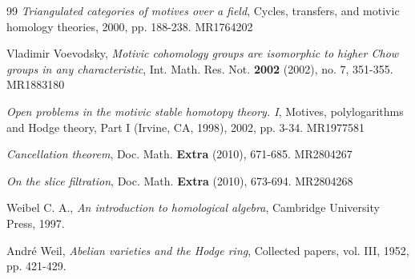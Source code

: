 \documentclass[10pt]{amsart}
\theoremstyle{definition}
\theoremstyle{remark}
\theoremstyle{definition}
\begin{document}
\begin{thebibliography}{99}
 \textit{Triangulated categories of motives over a field}, Cycles, transfers, and motivic homology theories, 2000, pp. 188-238. MR1764202

 Vladimir Voevodsky, \textit{Motivic cohomology groups are isomorphic to higher Chow groups in any characteristic}, Int. Math. Res. Not. \textbf{2002} (2002), no. 7, 351-355. MR1883180

 \textit{Open problems in the motivic stable homotopy theory. I}, Motives, polylogarithms and Hodge theory, Part I (Irvine, CA, 1998), 2002, pp. 3-34. MR1977581

 \textit{Cancellation theorem}, Doc. Math. \textbf{Extra} (2010), 671-685. MR2804267

 \textit{On the slice filtration}, Doc. Math. \textbf{Extra} (2010), 673-694. MR2804268

   Weibel C. A., \textit{An introduction to homological algebra}, Cambridge University Press, 1997.

 Andr\'e Weil, \textit{Abelian varieties and the Hodge ring}, Collected papers, vol. III, 1952, pp. 421-429.

\end{thebibliography}

\newpage
\end{document}
